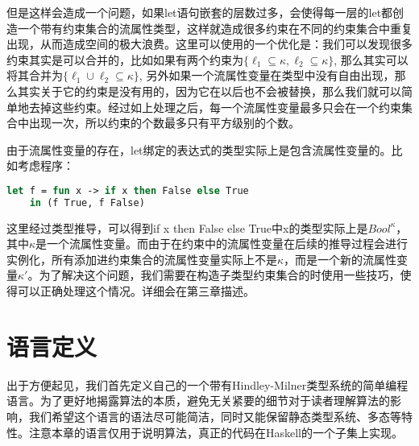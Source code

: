 \documentclass[UTF8, colorlinks]{pkuthss}
\begin{document}
	但是这样会造成一个问题，如果let语句嵌套的层数过多，会使得每一层的let都创造一个带有约束集合的流属性类型，这样就造成很多约束在不同的约束集合中重复出现，从而造成空间的极大浪费。这里可以使用的一个优化是：我们可以发现很多约束其实是可以合并的，比如如果有两个约束为$\{\ell_1\subseteq \kappa, \ell_2\subseteq \kappa\}$, 那么其实可以将其合并为$\{\ell_1\cup \ell_2 \subseteq \kappa\}$, 另外如果一个流属性变量在类型中没有自由出现，那么其实关于它的约束是没有用的，因为它在以后也不会被替换，那么我们就可以简单地去掉这些约束。经过如上处理之后，每一个流属性变量最多只会在一个约束集合中出现一次，所以约束的个数最多只有平方级别的个数。
	
	由于流属性变量的存在，let绑定的表达式的类型实际上是包含流属性变量的。比如考虑程序：
	\begin{lstlisting}[language=Ocaml]
	let f = fun x -> if x then False else True 
	in (f True, f False)
	\end{lstlisting}
	这里经过类型推导，可以得到if x then False else True中x的类型实际上是$Bool^\kappa$，其中$\kappa$是一个流属性变量。而由于在约束中的流属性变量在后续的推导过程会进行实例化，所有添加进约束集合的流属性变量实际上不是$\kappa$，而是一个新的流属性变量$\kappa'$。为了解决这个问题，我们需要在构造子类型约束集合的时使用一些技巧，使得可以正确处理这个情况。详细会在第三章描述。
	
		
	\chapter{语言定义}
	出于方便起见，我们首先定义自己的一个带有Hindley-Milner类型系统的简单编程语言。为了更好地揭露算法的本质，避免无关紧要的细节对于读者理解算法的影响，我们希望这个语言的语法尽可能简洁，同时又能保留静态类型系统、多态等特性。注意本章的语言仅用于说明算法，真正的代码在Haskell的一个子集上实现。
	
\end{document}
